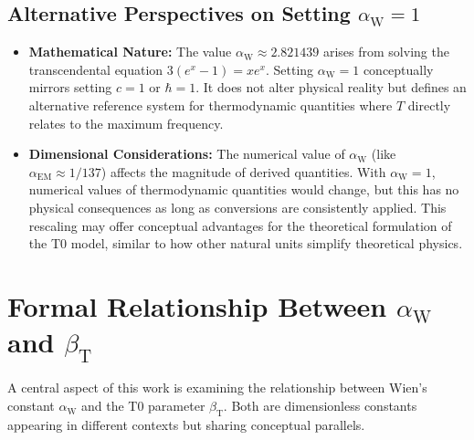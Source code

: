 \documentclass[12pt,a4paper]{article}
\newcommand{\betaT}{\beta_{\text{T}}}
\newcommand{\alphaEM}{\alpha_{\text{EM}}}
\newcommand{\alphaW}{\alpha_{\text{W}}}
\begin{document}
	\subsection{Alternative Perspectives on Setting \(\alphaW = 1\)}
	
	\begin{itemize}
		\item \textbf{Mathematical Nature:} The value \(\alphaW \approx 2.821439\) arises from solving the transcendental equation \(3(e^x - 1) = xe^x\). Setting \(\alphaW = 1\) conceptually mirrors setting \(c = 1\) or \(\hbar = 1\). It does not alter physical reality but defines an alternative reference system for thermodynamic quantities where \(T\) directly relates to the maximum frequency.
		\item \textbf{Dimensional Considerations:} The numerical value of \(\alphaW\) (like \(\alphaEM \approx 1/137\)) affects the magnitude of derived quantities. With \(\alphaW = 1\), numerical values of thermodynamic quantities would change, but this has no physical consequences as long as conversions are consistently applied. This rescaling may offer conceptual advantages for the theoretical formulation of the T0 model, similar to how other natural units simplify theoretical physics.
	\end{itemize}
	
	\section{Formal Relationship Between \(\alphaW\) and \(\betaT\)}
	
	A central aspect of this work is examining the relationship between Wien’s constant \(\alphaW\) and the T0 parameter \(\betaT\). Both are dimensionless constants appearing in different contexts but sharing conceptual parallels.
	
\end{document}
